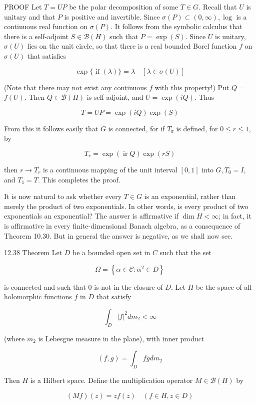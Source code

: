 \documentclass[10pt]{article}
\begin{document}
PROOF Let $T=U P$ be the polar decomposition of some $T \in G$. Recall that $U$ is unitary and that $P$ is positive and invertible. Since $\sigma(P) \subset(0, \infty), \log$ is a continuous real function on $\sigma(P)$. It follows from the symbolic calculus that there is a self-adjoint $S \in \mathscr{B}(H)$ such that $P=\exp (S)$. Since $U$ is unitary, $\sigma(U)$ lies on the unit circle, so that there is a real bounded Borel function $f$ on $\sigma(U)$ that satisfies

$$
\exp \{\text { if }(\lambda)\}=\lambda \quad[\lambda \in \sigma(U)]
$$

(Note that there may not exist any continuous $f$ with this property!) Put $Q=$ $f(U)$. Then $Q \in \mathscr{B}(H)$ is self-adjoint, and $U=\exp (i Q)$. Thus

$$
T=U P=\exp (i Q) \exp (S)
$$

From this it follows easily that $G$ is connected, for if $T_{\boldsymbol{r}}$ is defined, for $0 \leq r \leq 1$, by

$$
T_{r}=\exp (\operatorname{ir} Q) \exp (r S)
$$

then $r \rightarrow T_{r}$ is a continuous mapping of the unit interval $[0,1]$ into $G, T_{0}=I$, and $T_{1}=T$. This completes the proof.

It is now natural to ask whether every $T \in G$ is an exponential, rather than merely the product of two exponentials. In other words, is every product of two exponentials an exponential? The answer is affirmative if $\operatorname{dim} H<\infty$; in fact, it is affirmative in every finite-dimensional Banach algebra, as a consequence of Theorem 10.30. But in general the answer is negative, as we shall now see.

12.38 Theorem Let $D$ be a bounded open set in $C$ such that the set

$$
\Omega=\left\{\alpha \in \mathscr{C}: \alpha^{2} \in D\right\}
$$

is connected and such that 0 is not in the closure of $D$. Let $H$ be the space of all holomorphic functions $f$ in $D$ that satisfy

$$
\int_{D}|f|^{2} d m_{2}<\infty
$$

(where $m_{2}$ is Lebesgue measure in the plane), with inner product

$$
(f, g)=\int_{D} f \bar{g} d m_{2}
$$

Then $H$ is a Hilbert space. Define the multiplication operator $M \in \mathscr{B}(H)$ by

$$
(M f)(z)=z f(z) \quad(f \in H, z \in D)
$$
\end{document}
